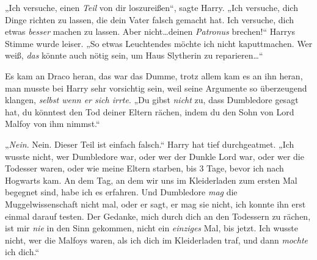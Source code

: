 „Ich versuche, einen \emph{Teil} von dir loszureißen“, sagte Harry. „Ich versuche, dich Dinge richten zu lassen, die dein Vater falsch gemacht hat. Ich versuche, dich etwas \emph{besser} machen zu lassen. Aber nicht…deinen \emph{Patronus} brechen!“ Harrys Stimme wurde leiser. „So etwas Leuchtendes möchte ich nicht kaputtmachen. Wer weiß, \emph{das} könnte auch nötig sein, um Haus Slytherin zu reparieren…“

Es kam an Draco heran, das war das Dumme, trotz allem kam es an ihn heran, man musste bei Harry sehr vorsichtig sein, weil seine Argumente so überzeugend klangen, \emph{selbst wenn er sich irrte}. „Du gibst \emph{nicht} zu, dass Dumbledore gesagt hat, du könntest den Tod deiner Eltern rächen, indem du den Sohn von Lord Malfoy von ihm nimmst.“

„\emph{Nein}. Nein. Dieser Teil ist einfach falsch.“ Harry hat tief durchgeatmet. „Ich wusste nicht, wer Dumbledore war, oder wer der Dunkle Lord war, oder wer die Todesser waren, oder wie meine Eltern starben, bis 3 Tage, bevor ich nach Hogwarts kam. An dem Tag, an dem wir uns im Kleiderladen zum ersten Mal begegnet sind, habe ich es erfahren. Und Dumbledore \emph{mag} die Muggelwissenschaft nicht mal, oder er sagt, er mag sie nicht, ich konnte ihn erst einmal darauf testen. Der Gedanke, mich durch dich an den Todessern zu rächen, ist mir \emph{nie} in den Sinn gekommen, nicht ein \emph{einziges} Mal, bis jetzt. Ich wusste nicht, wer die Malfoys waren, als ich dich im Kleiderladen traf, und dann \emph{mochte} ich dich.“


